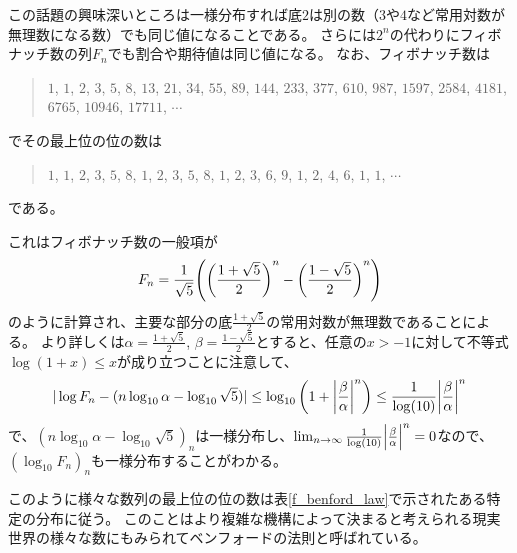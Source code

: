 この話題の興味深いところは一様分布すれば底$2$は別の数（$3$や$4$など常用対数が無理数になる数）でも同じ値になることである。
さらには$2^n$の代わりにフィボナッチ数の列$F_n$でも割合や期待値は同じ値になる。
なお、フィボナッチ数は
\begin{quote}
$1$, $1$, $2$, $3$, $5$, $8$, $13$, $21$, $34$, $55$, $89$, $144$, $233$, $377$, $610$, $987$, $1597$, $2584$, $4181$, $6765$, $10946$, $17711$, $\cdots$
\end{quote}
でその最上位の位の数は
\begin{quote}
$1$, $1$, $2$, $3$, $5$, $8$, $1$, $2$, $3$, $5$, $8$, $1$, $2$, $3$, $6$, $9$, $1$, $2$, $4$, $6$, $1$, $1$, $\cdots$
\end{quote}
である。

これはフィボナッチ数の一般項が
$$
F_n = \frac{1}{\sqrt{5}}\qty(\qty(\frac{1+\sqrt{5}}{2})^n-\qty(\frac{1-\sqrt{5}}{2})^n)
$$
のように計算され、主要な部分の底$\frac{1+\sqrt{5}}{2}$の常用対数が無理数であることによる。
より詳しくは$\alpha = \frac{1+\sqrt{5}}{2}$, $\beta = \frac{1-\sqrt{5}}{2}$とすると、任意の$x > -1$に対して不等式$\log(1+x) \le x$が成り立つことに注意して、
$$
|\log F_n-(n\log_{10}\alpha-\log_{10}\sqrt{5})| \le \log_{10}\qty(1+\abs{\frac{\beta}{\alpha}}^n) \le \frac{1}{\log(10)}\abs{\frac{\beta}{\alpha}}^n
$$
で、$(n\log_{10}\alpha-\log_{10}\sqrt{5})_n$は一様分布し、$\lim_{n \to \infty}\frac{1}{\log(10)}\abs{\frac{\beta}{\alpha}}^n = 0$なので、$(\log_{10}F_n)_n$も一様分布することがわかる。

このように様々な数列の最上位の位の数は表\ref{f_benford_law}で示されたある特定の分布に従う。
このことはより複雑な機構によって決まると考えられる現実世界の様々な数にもみられてベンフォードの法則と呼ばれている。
